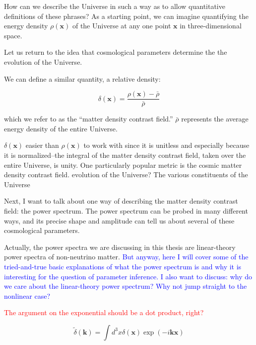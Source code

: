 How can we describe the Universe in such 
a way as to allow quantitative definitions of these phrases? As a starting 
point, we can imagine quantifying the energy density $\rho(\bm{x})$ of the
Universe at any one point $\bm{x}$ in three-dimensional space.

Let us return to the idea that cosmological parameters determine the the 
evolution of the Universe.

We can define a similar quantity, a relative density:

\begin{equation}
\delta(\bm{x}) = \frac{\rho(\bm{x}) - \bar{\rho}}{\bar{\rho}}
\end{equation}

which we refer to as the ``matter density contrast field.'' $\bar{\rho}$
represents the average energy density of the entire Universe.

$\delta(\bm{x})$ easier than $\rho(\bm{x})$ to work with since it
is unitless and especially because it is normalized--the integral of the
matter density contrast field, taken over the entire Universe, is unity. One particularly popular metric is the cosmic matter density 
contrast field. evolution of the Universe? The various constituents of the Universe 

Next, I want to talk about one way of describing the matter density contrast 
field: the power spectrum. The power spectrum can be probed in many different 
ways, and its precise shape and amplitude can tell us about several of these 
cosmological parameters.

Actually, the power spectra we are discussing in this thesis are linear-theory
power spectra of non-neutrino matter. \textcolor{blue}{But anyway, here I will cover some of 
the tried-and-true basic explanations of what the power spectrum is and why it 
is interesting for the question of parameter inference. I also want to 
discuss: why do we care about the linear-theory power spectrum? Why not jump 
straight to the nonlinear case?}

\textcolor{red}{The argument on the exponential should be a dot product, 
right?}

\begin{equation}
\tilde{\delta} (\bm{k}) = \int d^3 x \delta(\bm{x}) \exp(-i \bm{k} \bm{x})
\end{equation}

